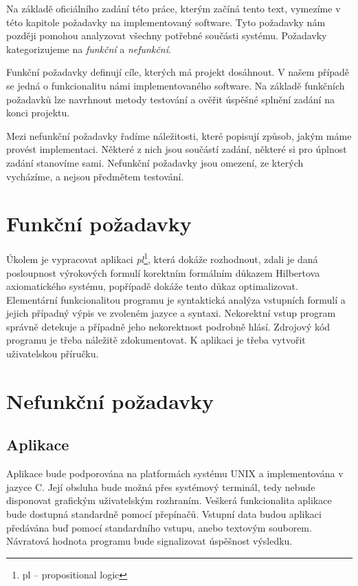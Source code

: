 \documentclass[thesis=B,czech,hidelinks]{FITthesis}[2012/06/26]
\begin{document}
Na základě oficiálního zadání této práce, kterým začíná tento text, vymezíme v této kapitole požadavky na implementovaný software. Tyto požadavky nám později pomohou analyzovat všechny potřebné součásti systému. Požadavky kategorizujeme na \emph{funkční} a \emph{nefunkční}.

Funkční požadavky definují cíle, kterých má projekt dosáhnout. V našem případě se jedná o funkcionalitu námi implementovaného software. Na základě funkčních požadavků lze navrhnout metody testování a ověřit úspěšné splnění zadání na konci projektu.

Mezi nefunkční požadavky řadíme náležitosti, které popisují způsob, jakým máme provést implementaci. Některé z nich jsou součástí zadání, některé si pro úplnost zadání stanovíme sami. Nefunkční požadavky jsou omezení, ze kterých vycházíme, a nejsou předmětem testování.

\section{Funkční požadavky}

Úkolem je vypracovat aplikaci \emph{pl}\footnote{pl -- propositional logic}, která dokáže rozhodnout, zdali je daná posloupnost výrokových formulí korektním formálním důkazem Hilbertova axiomatického systému, popřípadě dokáže tento důkaz optimalizovat. Elementární funkcionalitou programu je syntaktická analýza vstupních formulí a jejich případný výpis ve zvoleném jazyce a syntaxi. Nekorektní vstup program správně detekuje a případně jeho nekorektnost podrobně hlásí. Zdrojový kód programu je třeba náležitě zdokumentovat. K aplikaci je třeba vytvořit uživatelskou příručku.

\section{Nefunkční požadavky}

\subsection{Aplikace}

Aplikace bude podporována na platformách systému UNIX a implementována v jazyce C. Její obsluha bude možná přes systémový terminál, tedy nebude disponovat grafickým uživatelským rozhraním. Veškerá funkcionalita aplikace bude dostupná standardně pomocí přepínačů. Vstupní data budou aplikaci předávána buď pomocí standardního vstupu, anebo textovým souborem. Návratová hodnota programu bude signalizovat úspěšnost výsledku.
\end{document}
